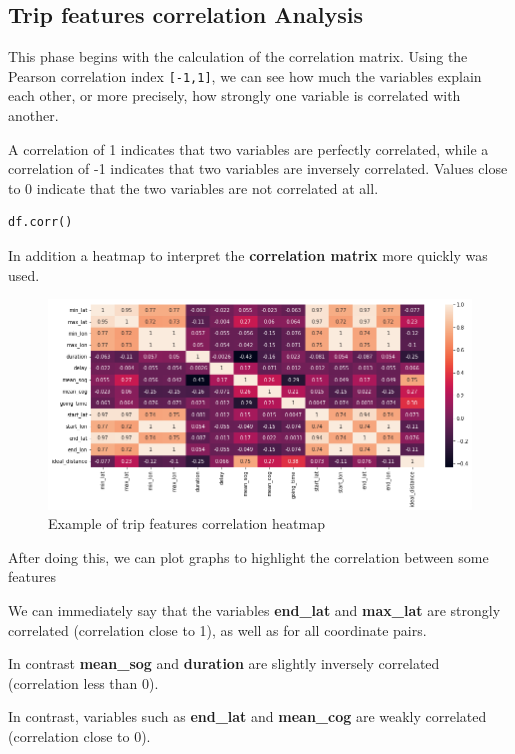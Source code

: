 \subsection{Trip features correlation Analysis}

This phase begins with the calculation of the correlation matrix. Using the Pearson correlation index \verb|[-1,1]|, we can see how much the variables explain each other, or more precisely, how strongly one variable is correlated with another.

A correlation of 1 indicates that two variables are perfectly correlated, while a correlation of -1 indicates that two variables are inversely correlated. Values close to 0 indicate that the two variables are not correlated at all.

\begin{lstlisting}[language=Python]
df.corr()
\end{lstlisting}

In addition a heatmap to interpret the \textbf{correlation matrix} more quickly was used.

\begin{figure}[H]
    \centering
    \includegraphics[width=17cm]{Images/2/heatmap.png}
    \caption{Example of trip features correlation heatmap}
\end{figure}

After doing this, we can plot graphs to highlight the correlation between some features

We can immediately say that the variables \textbf{end\_lat} and \textbf{max\_lat} are strongly correlated (correlation close to 1), as well as for all coordinate pairs.

In contrast \textbf{mean\_sog} and \textbf{duration} are slightly inversely correlated (correlation less than 0).

In contrast, variables such as \textbf{end\_lat} and \textbf{mean\_cog} are weakly correlated (correlation close to 0).

